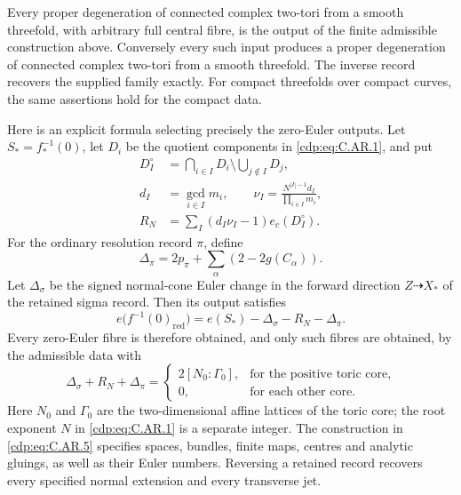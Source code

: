 \begin{proposition}\label{cdp:st:C.2.UN.86}
Every proper degeneration of connected complex two-tori
from a smooth threefold, with arbitrary full central
fibre, is the output of the finite admissible construction
above. Conversely every such input produces a proper
degeneration of connected complex two-tori from a smooth
threefold. The inverse record recovers the supplied
family exactly. For compact threefolds over compact
curves, the same assertions hold for the compact data.

Here is an explicit formula selecting precisely the
zero-Euler outputs. Let \(S_*=f_*^{-1}(0)\), let
\(D_i\) be the quotient components in \eqref{cdp:eq:C.AR.1}, and put
\[
 \begin{split}
 D_I^\circ&=\bigcap_{i\in I}D_i
                    \setminus\bigcup_{j\notin I}D_j,\\
 d_I&=\gcd_{i\in I}m_i,\qquad
 \nu_I=\frac{N^{|I|-1}d_I}{\prod_{i\in I}m_i},\\
 R_N&=\sum_I(d_I\nu_I-1)e_c(D_I^\circ).
 \end{split}
 \tag{C.AR.2}\label{cdp:eq:C.AR.2}
\]
For the ordinary resolution record \(\pi\), define
\[
 \Delta_\pi=2p_\pi+\sum_\alpha(2-2g(C_\alpha)).
 \tag{C.AR.3}\label{cdp:eq:C.AR.3}
\]
Let \(\Delta_\sigma\) be the signed normal-cone Euler
change in the forward direction \(Z\dashrightarrow X_*\)
of the retained sigma record. Then its output satisfies
\[
 e\bigl(f^{-1}(0)_{\mathrm{red}}\bigr)
       =e(S_*)-\Delta_\sigma-R_N-\Delta_\pi.
 \tag{C.AR.4}\label{cdp:eq:C.AR.4}
\]
Every zero-Euler fibre is therefore obtained, and only
such fibres are obtained, by the admissible data with
\[
 \Delta_\sigma+R_N+\Delta_\pi=
 \begin{cases}
  2[N_0:\Gamma_0],&\text{for the positive toric core},\\
  0,&\text{for each other core}.
 \end{cases}
 \tag{C.AR.5}\label{cdp:eq:C.AR.5}
\]
Here \(N_0\) and \(\Gamma_0\) are the two-dimensional
affine lattices of the toric core; the root exponent
\(N\) in \eqref{cdp:eq:C.AR.1} is a separate integer. The construction
in \eqref{cdp:eq:C.AR.5} specifies spaces, bundles, finite maps,
centres and analytic gluings, as well as their Euler
numbers. Reversing a retained record recovers every
specified normal extension and every transverse jet.


\end{proposition}
